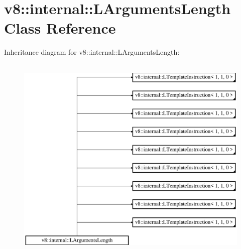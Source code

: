 \hypertarget{classv8_1_1internal_1_1_l_arguments_length}{}\section{v8\+:\+:internal\+:\+:L\+Arguments\+Length Class Reference}
\label{classv8_1_1internal_1_1_l_arguments_length}
Inheritance diagram for v8\+:\+:internal\+:\+:L\+Arguments\+Length\+:\begin{figure}[H]
\begin{center}
\leavevmode
\includegraphics[height=10.000000cm]{classv8_1_1internal_1_1_l_arguments_length}
\end{center}
\end{figure}

